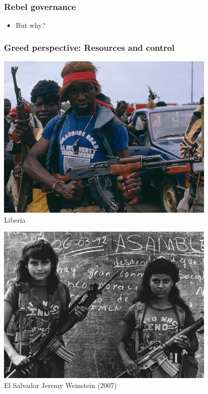 \documentclass[utf8, xcolor=dvipsnames]{beamer}
\begin{document}
\begin{frame}
\frametitle{Rebel governance}
\centering

\begin{itemize}
  \item But why?
\end{itemize}

\end{frame}

\begin{frame}
\frametitle{Greed perspective: Resources and control}
\centering

\begin{minipage}{0.6\textwidth}\centering
\includegraphics[width = 0.8\textwidth]{img/liberia}\\Liberia
\end{minipage}\hfill
\begin{minipage}{0.39\textwidth}\centering
\includegraphics[width = 0.8\textwidth]{img/fmln}\\El Salvador
{\small Jeremy Weinstein (2007)}
\end{minipage}

\end{frame}
\end{document}
